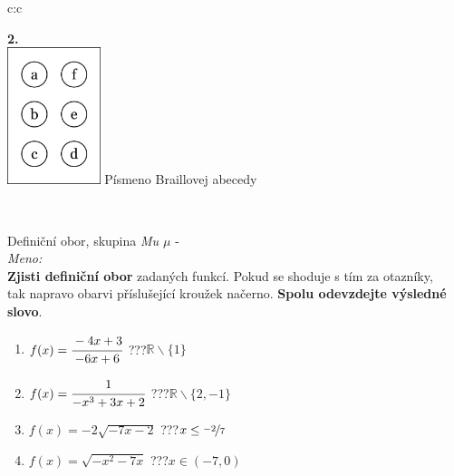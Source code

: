 \documentclass[10pt]{report}
\begin{document}
\begin{tabular}{c:c}
\begin{minipage}[c][99mm][t]{0.49\linewidth}
\begin{center}
\begin{minipage}{0.77\linewidth}
\begin{center}
\begin{varwidth}{\textwidth}
\begin{enumerate}
\end{enumerate}
\end{varwidth}
\end{center}
\end{minipage}
\begin{minipage}{0.20\linewidth}
\begin{center}
{\Huge\bfseries 2.} \\[2mm]
\includegraphics[height=40mm]{../images/braille.png}
{\small Písmeno Braillovej abecedy}
\end{center}
\end{minipage}
\end{center}
\end{minipage}
\\ \hdashline
\begin{minipage}[c][99mm][t]{0.49\linewidth}
\begin{center}
\vspace{7mm}
{\huge Definiční obor, skupina \textit{Mu $\mu$} -}\\[4.5mm]
\textit{Meno:}\phantom{xxxxxxxxxxxxxxxxxxxxxxxxxxxxxxxxxxxxxxxxxxxxxxxxxxxxxxxxxxxxxxxxx}\\[3.5mm]
\textbf{Zjisti definiční obor} zadaných funkcí. Pokud se shoduje s tím za otazníky,\\tak napravo obarvi příslušející kroužek načerno. \textbf{Spolu odevzdejte výsledné slovo}.\\[3mm]
\begin{minipage}{0.77\linewidth}
\begin{center}
\begin{varwidth}{\textwidth}
\begin{enumerate}
\normalsize
\item $f(x)=\cfrac{-4x+3}{-6x+6}$\quad \dotfill\; ???\;\dotfill \quad $\mathbb{R}\smallsetminus\{1\}$
\item $f(x)=\cfrac{1}{-x^3+3x+2}$\quad \dotfill\; ???\;\dotfill \quad $\mathbb{R}\smallsetminus\{2,-1\}$
\item $f(x)=-2\sqrt{-7x-2}$\quad \dotfill\; ???\;\dotfill \quad $x\leq\nicefrac{-2}{7}$
\item $f(x)=\sqrt{-x^2-7x}$\quad \dotfill\; ???\;\dotfill \quad $x\in(-7 , 0)$

\end{enumerate}
\end{varwidth}
\end{center}
\end{minipage}
\end{center}
\end{minipage}
\end{tabular}
\end{document}
